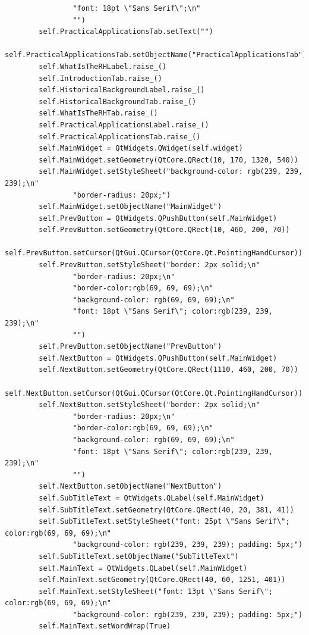 \documentclass{article}
\begin{document}
\begin{lstlisting}
                "font: 18pt \"Sans Serif\";\n"
                "")
        self.PracticalApplicationsTab.setText("")
        self.PracticalApplicationsTab.setObjectName("PracticalApplicationsTab")
        self.WhatIsTheRHLabel.raise_()
        self.IntroductionTab.raise_()
        self.HistoricalBackgroundLabel.raise_()
        self.HistoricalBackgroundTab.raise_()
        self.WhatIsTheRHTab.raise_()
        self.PracticalApplicationsLabel.raise_()
        self.PracticalApplicationsTab.raise_()
        self.MainWidget = QtWidgets.QWidget(self.widget)
        self.MainWidget.setGeometry(QtCore.QRect(10, 170, 1320, 540))
        self.MainWidget.setStyleSheet("background-color: rgb(239, 239, 239);\n"
                "border-radius: 20px;")
        self.MainWidget.setObjectName("MainWidget")
        self.PrevButton = QtWidgets.QPushButton(self.MainWidget)
        self.PrevButton.setGeometry(QtCore.QRect(10, 460, 200, 70))
        self.PrevButton.setCursor(QtGui.QCursor(QtCore.Qt.PointingHandCursor))
        self.PrevButton.setStyleSheet("border: 2px solid;\n"
                "border-radius: 20px;\n"
                "border-color:rgb(69, 69, 69);\n"
                "background-color: rgb(69, 69, 69);\n"
                "font: 18pt \"Sans Serif\"; color:rgb(239, 239, 239);\n"
                "")
        self.PrevButton.setObjectName("PrevButton")
        self.NextButton = QtWidgets.QPushButton(self.MainWidget)
        self.NextButton.setGeometry(QtCore.QRect(1110, 460, 200, 70))
        self.NextButton.setCursor(QtGui.QCursor(QtCore.Qt.PointingHandCursor))
        self.NextButton.setStyleSheet("border: 2px solid;\n"
                "border-radius: 20px;\n"
                "border-color:rgb(69, 69, 69);\n"
                "background-color: rgb(69, 69, 69);\n"
                "font: 18pt \"Sans Serif\"; color:rgb(239, 239, 239);\n"
                "")
        self.NextButton.setObjectName("NextButton")
        self.SubTitleText = QtWidgets.QLabel(self.MainWidget)
        self.SubTitleText.setGeometry(QtCore.QRect(40, 20, 381, 41))
        self.SubTitleText.setStyleSheet("font: 25pt \"Sans Serif\"; color:rgb(69, 69, 69);\n"
                "background-color: rgb(239, 239, 239); padding: 5px;")
        self.SubTitleText.setObjectName("SubTitleText")
        self.MainText = QtWidgets.QLabel(self.MainWidget)
        self.MainText.setGeometry(QtCore.QRect(40, 60, 1251, 401))
        self.MainText.setStyleSheet("font: 13pt \"Sans Serif\"; color:rgb(69, 69, 69);\n"
                "background-color: rgb(239, 239, 239); padding: 5px;")
        self.MainText.setWordWrap(True)

\end{lstlisting}
\end{document}

